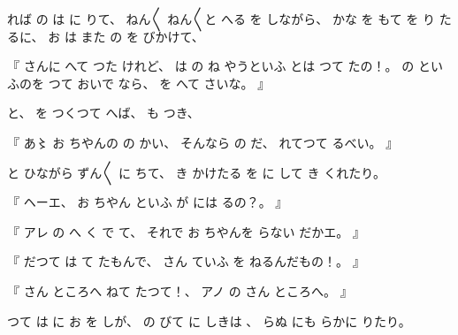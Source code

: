 %
れば
の
は
に
りて、
%
ねん〳〵
ねん〳〵と
へる
を
しながら、
%
かな
を
もて
を
り
たるに、
%
お
は
また
の
を
びかけて、

%
『
さんに
へて
つた
けれど、
%
は%
の
ね
やうといふ
とは
つて
たの！。
%
の
といふのを
つて
おいで
なら、
%
を
へて
さいな。
』

%
と、
%
を
つくつて
へば、
%
も
つき、

%
『
あ〻%
お
ちやんの
の
かい、
%
そんなら
の
だ、
%
れてつて
るべい。
』

%
と
ひながら
ずん〳〵
に
ちて、
%
き
かけたる
を
に
して
き
くれたり。

%
『
ヘーエ、
%
お
ちやん
といふ
が
には
るの？。
』

%
『
アレ
の
へ
く
で
て、
%
それで
お
ちやんを
らない
だかエ。
』

%
『
だつて
は
て
たもんで、
%
さん
ていふ
を
ねるんだもの！。
』

%
『
さん
ところへ
ねて
たつて！、
%
アノ
の
さん
ところへ。
』

%
つて
は
に
お
を
しが、
%
の
びて
に
しきは
、
%
%
らぬ
にも
らかに
りたり。

